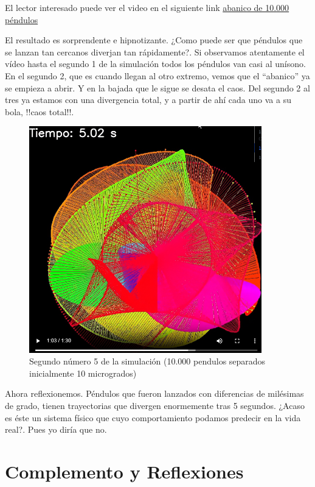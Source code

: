 \documentclass[
  10pt,
  a4paper,
  DIV=11,
  numbers=noendperiod,
  open=any]{scrreprt}
\numberwithin{equation}{chapter}
\numberwithin{equation}{section}
\renewcommand{\[}{\begin{equation}}
\renewcommand{\]}{\end{equation}}
\begin{document}
El lector interesado puede ver el video en el siguiente link \href{https://colacaos.github.io/ColaCAOS/02-pendulo-doble/Pendulumabanico.mp4}{abanico de 10.000 péndulos}

El resultado es sorprendente e hipnotizante. ¿Como puede ser que
péndulos que se lanzan tan cercanos diverjan tan rápidamente?. Si
observamos atentamente el vídeo hasta el segundo 1 de la simulación
todos los péndulos van casi al unísono. En el segundo 2, que es cuando
llegan al otro extremo, vemos que el ``abanico'' ya se empieza a abrir.
Y en la bajada que le sigue se desata el caos. Del segundo 2 al tres ya
estamos con una divergencia total, y a partir de ahí cada uno va a su
bola, !!caos total!!.

\begin{figure}[h]
  \centering
  \includegraphics[width=0.9\textwidth]{02-pendulo-doble/abanico.png}
  \caption{Segundo número 5 de la simulación (10.000 pendulos separados inicialmente 10 microgrados)}
\end{figure}

Ahora reflexionemos. Péndulos que fueron lanzados con diferencias de
milésimas de grado, tienen trayectorias que divergen enormemente tras 5
segundos. ¿Acaso es éste un sistema físico que cuyo comportamiento
podamos predecir en la vida real?. Pues yo diría que no.

\section{Complemento y Reflexiones}\label{complemento-y-reflexiones}
\end{document}
